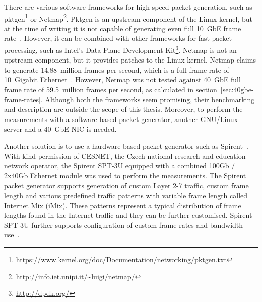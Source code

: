 There are various software frameworks for high-speed packet generation,
such as pktgen\footnote{\url{https://www.kernel.org/doc/Documentation/networking/pktgen.txt}}
or Netmap\footnote{\url{http://info.iet.unipi.it/~luigi/netmap/}}.
Pktgen is an upstream component of the Linux kernel, but
at the time of writing it is not capable of generating even full 10~GbE frame rate~\cite{netmap}.
However, it can be combined with other frameworks for fast packet processing, such as
Intel's Data Plane Development Kit\footnote{\url{http://dpdk.org/}}.
Netmap is not an upstream component, but it provides patches to the Linux kernel.
Netmap claims to generate 14.88~million frames per second, which is a full frame rate of 10~Gigabit Ethernet~\cite{netmap}.
However, Netmap was not tested against 40~GbE full frame rate of 59.5~million frames per second,
as calculated in section~\ref{sec:40gbe-frame-rates}.
Although both the frameworks seem promising, their benchmarking and description
are outside the scope of this thesis.
Moreover, to perform the measurements with a software-based packet generator,
another GNU/Linux server and a 40~GbE NIC is needed.

Another solution is to use a hardware-based packet generator such as Spirent~\cite{spirent}.
With kind permission of CESNET, the Czech national research and education network operator,
the Spirent SPT-3U equipped with a combined 100Gb / 2x40Gb Ethernet module was used to perform the measurements.
The Spirent packet generator supports generation of custom Layer 2-7 traffic, custom frame length and various
predefined traffic patterns with variable frame length called Internet Mix (iMix).
These patterns represent a typical distribution of frame lengths found in the Internet traffic
and they can be further customised.
Spirent SPT-3U further supports configuration of custom frame rates and bandwidth use~\cite{spirent}.
